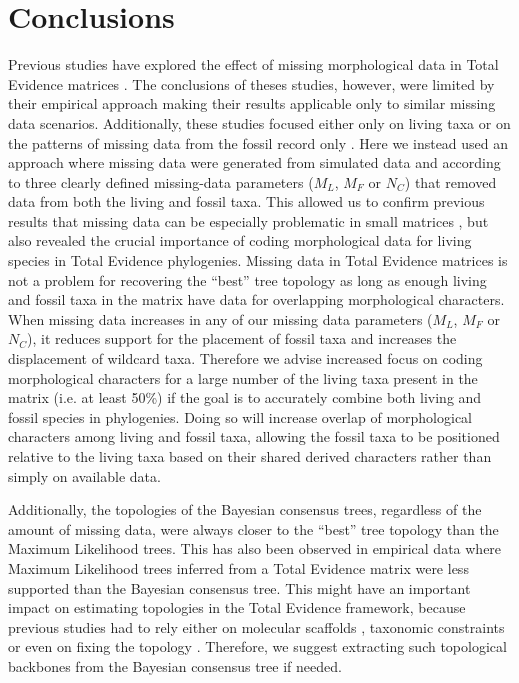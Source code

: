\section{Conclusions}
Previous studies have explored the effect of missing morphological data in Total Evidence matrices \citep{Wiens01102005,manosphylogeny2007,pattinsonphylogeny2014}.
The conclusions of theses studies, however, were limited by their empirical approach making their results applicable only to similar missing data scenarios.
Additionally, these studies focused either only on living taxa \citep{Wiens01102005} or on the patterns of missing data from the fossil record only \citep{manosphylogeny2007,pattinsonphylogeny2014}.
Here we instead used an approach where missing data were generated from simulated data and according to three clearly defined missing-data parameters ($M_{L}$, $M_{F}$ or $N_{C}$) that removed data from both the living and fossil taxa.
This allowed us to confirm previous results that missing data can be especially problematic in small matrices \citep{wiensmissing2003}, but also revealed the crucial importance of coding morphological data for living species in Total Evidence phylogenies.
Missing data in Total Evidence matrices is not a problem for recovering the ``best'' tree topology as long as enough living and fossil taxa in the matrix have data for overlapping morphological characters.
When missing data increases in any of our missing data parameters ($M_{L}$, $M_{F}$ or $N_{C}$), it reduces support for the placement of fossil taxa and increases the displacement of wildcard taxa.
Therefore we advise increased focus on coding morphological characters for a large number of the living taxa present in the matrix (i.e. at least 50\%) if the goal is to accurately combine both living and fossil species in phylogenies.
Doing so will increase overlap of morphological characters among living and fossil taxa, allowing the fossil taxa to be positioned relative to the living taxa based on their shared derived characters rather than simply on available data.

Additionally, the topologies of the Bayesian consensus trees, regardless of the amount of missing data, were always closer to the ``best'' tree topology than the Maximum Likelihood trees.
This has also been observed in empirical data \citep[e.g.][]{Arcila2015131} where Maximum Likelihood trees inferred from a Total Evidence matrix were less supported than the Bayesian consensus tree.
This might have an important impact on estimating topologies in the Total Evidence framework, because previous studies had to rely either on molecular scaffolds \citep[e.g.][]{slaterphylogenetic2013}, taxonomic constraints \citep[e.g.][]{slaterphylogenetic2013,beckancient2014} or even on fixing the topology \citep[e.g.][]{ronquista2012}.
Therefore, we suggest extracting such topological backbones from the Bayesian consensus tree if needed.
